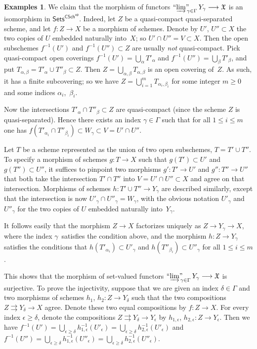 \documentclass[12pt,a4paper]{amsart}
\newcommand{\+}{\protect\nobreakdash-}
\renewcommand{\:}{\colon}
\newcommand{\rarrow}{\longrightarrow}
\newcommand{\Sets}{\mathsf{Sets}}
\newcommand{\CSch}{\mathsf{CSch}}
\newcommand{\sop}{\mathsf{op}}
\newcommand{\ilim}
 {\mathop{\text{\normalfont``$\varinjlim$''\!\!}}\nolimits}
\newcommand{\fX}{\mathfrak X}
\theoremstyle{plain}
\theoremstyle{definition}
\newtheorem{exs}[thm]{Examples}
\begin{document}
\begin{exs}
 We claim that the morphism of functors
$\ilim_{\gamma\in\Gamma}Y_\gamma\rarrow\fX$ is an isomorphism
in $\Sets^{\CSch^\sop}$.
 Indeed, let $Z$ be a quasi-compact quasi-separated scheme, and
let $f\:Z\rarrow X$ be a morphism of schemes.
 Denote by $U'$, $U''\subset X$ the two copies of $U$ embedded
naturally into~$X$; so $U'\cap U''=V\subset X$.
 Then the open subschemes $f^{-1}(U')$ and $f^{-1}(U'')\subset Z$
are usually \emph{not} quasi-compact.
 Pick quasi-compact open coverings $f^{-1}(U')=\bigcup_\alpha
T'_\alpha$ and $f^{-1}(U'')=\bigcup_\beta T'_\beta$, and put
$T_{\alpha,\beta}=T'_\alpha\cup T''_\beta\subset Z$.
 Then $Z=\bigcup_{\alpha,\beta}T_{\alpha,\beta}$ is an open covering
of~$Z$.
 As such, it has a finite subcovering; so we have
$Z=\bigcup_{i=1}^mT_{\alpha_i,\beta_i}$ for some integer $m\ge0$
and some indices $\alpha_i$,~$\beta_i$.

 Now the intersections $T'_\alpha\cap T''_\beta\subset Z$ are
quasi-compact (since the scheme $Z$ is quasi-separated).
 Hence there exists an index $\gamma\in\Gamma$ such that
for all $1\le i\le m$ one has $f(T'_{\alpha_i}\cap T''_{\beta_i})
\subset W_\gamma\subset V=U'\cap U''$.

 Let $T$ be a scheme represented as the union of two open subschemes,
$T=T'\cup T''$.
 To specify a morphism of schemes $g\:T\rarrow X$ such that
$g(T')\subset U'$ and $g(T'')\subset U''$, it suffices to pinpoint two
morphisms $g'\:T'\rarrow U'$ and $g''\:T''\rarrow U''$ that both take
the intersection $T'\cap T''$ into $V=U'\cap U''\subset X$ and agree
on that intersection.
 Morphisms of schemes $h\:T'\cup T''\rarrow Y_\gamma$ are described
similarly, except that the intersection is now
$U'_\gamma\cap U''_\gamma=W_\gamma$, with the obvious notation
$U'_\gamma$ and $U''_\gamma$ for the two copies of $U$ embedded
naturally into~$Y_\gamma$.

 It follows easily that the morphism $Z\rarrow X$ factorizes
uniquely as $Z\rarrow Y_\gamma\rarrow X$, where the index
$\gamma$~satisfies the condition above, and the morphism
$h\:Z\rarrow Y_\gamma$ satisfies the conditions that
$h(T'_{\alpha_i})\subset U'_\gamma$ and
$h(T''_{\beta_i})\subset U''_\gamma$ for all $1\le i\le m$.
 
 This shows that the morphism of set-valued functors
$\ilim_{\gamma\in\Gamma}Y_\gamma\rarrow\fX$ is surjective.
 To prove the injectivity, suppose that we are given an index
$\delta\in\Gamma$ and two morphisms of schemes
$h_1$, $h_2\:Z\rarrow Y_\delta$ such that the two compositions
$Z\rightrightarrows Y_\delta\rarrow X$ agree.
 Denote these two equal compositions by $f\:Z\rarrow X$.
 For every index $\epsilon\ge\delta$, denote the compositions
$Z\rightrightarrows Y_\delta\rarrow Y_\epsilon$ by
$h_{1,\epsilon}$, $h_{2,\epsilon}\:Z\rarrow Y_\epsilon$.
 Then we have $f^{-1}(U')=\bigcup_{\epsilon\ge\delta}
h_{1,\epsilon}^{-1}(U'_\epsilon)=\bigcup_{\epsilon\ge\delta}
h_{2,\epsilon}^{-1}(U'_\epsilon)$ and $f^{-1}(U'')=
\bigcup_{\epsilon\ge\delta}h_{1,\epsilon}^{-1}(U''_\epsilon)=
\bigcup_{\epsilon\ge\delta}h_{2,\epsilon}^{-1}(U''_\epsilon)$.


\end{exs}
\end{document}
